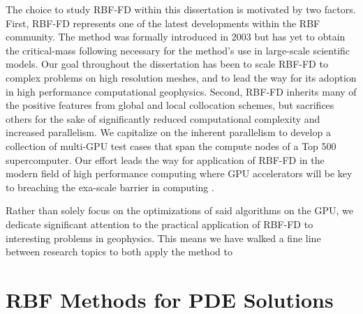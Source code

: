 \documentclass{report}
\begin{document}
{The choice to study RBF-FD within this dissertation is motivated by two factors. First, RBF-FD represents one of the latest developments within the RBF community. The method was formally introduced in 2003 but has yet to obtain the critical-mass following necessary for the method's use in large-scale scientific models. Our goal throughout the dissertation has been to scale RBF-FD to complex problems on high resolution meshes, and to lead the way for its adoption in high performance computational geophysics. Second, RBF-FD inherits many of the positive features from global and local collocation schemes, but sacrifices others for the sake of significantly reduced computational complexity and increased parallelism. We capitalize on the inherent parallelism to develop a collection of multi-GPU test cases that span the compute nodes of a Top 500 supercomputer. Our effort leads the way for application of RBF-FD in the modern field of high performance computing where GPU accelerators will be key to breaching the exa-scale barrier in computing \cite{GPUandExascale2011}.


Rather than solely focus on the optimizations of said algorithms on the GPU, we dedicate significant attention to the practical application of RBF-FD to interesting problems in geophysics. This means we have walked a fine line between research topics to both apply the method to 


\chapter{RBF Methods for PDE Solutions} 

%
%
%




}
\end{document}
